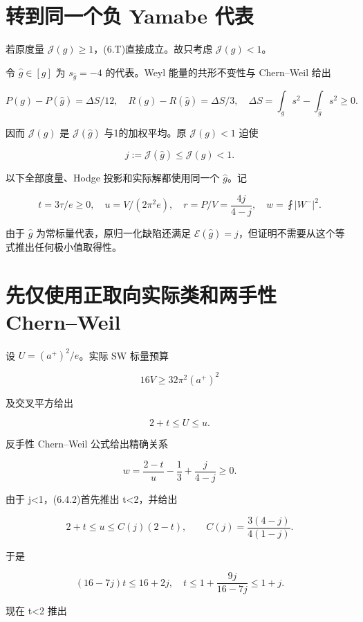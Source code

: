 \documentclass[UTF8,11pt,openany,fontset=none]{ctexbook}
\theoremstyle{definition}
\theoremstyle{remark}
\begin{document}
\section{转到同一个负 Yamabe 代表}\label{v6-ux8f6cux5230ux540cux4e00ux4e2aux8d1f-yamabe-ux4ee3ux8868}

若原度量 \(\mathcal J(g)\ge1\)，(6.T)直接成立。故只考虑 \(\mathcal J(g)<1\)。

令 \(\hat g\in[g]\) 为 \(s_{\hat g}=-4\) 的代表。Weyl 能量的共形不变性与 Chern--Weil 给出

\[
P(g)-P(\hat g)=\Delta S/12,\quad
R(g)-R(\hat g)=\Delta S/3,
\quad\Delta S=\int_gs^2-\int_{\hat g}s^2\ge0.
\]

因而 \(\mathcal J(g)\) 是 \(\mathcal J(\hat g)\) 与1的加权平均。原 \(\mathcal J(g)<1\) 迫使

\[
j:=\mathcal J(\hat g)\le\mathcal J(g)<1.
\tag{6.3.1}
\]

以下全部度量、Hodge 投影和实际解都使用同一个 \(\hat g\)。记

\[
t=3\tau/e\ge0,\quad u=V/(2\pi^2e),\quad
r=P/V=\frac{4j}{4-j},\quad
w=\fint|W^-|^2.
\tag{6.3.2}
\]

由于 \(\hat g\) 为常标量代表，原归一化缺陷还满足 \(\mathcal E(\hat g)=j\)，但证明不需要从这个等式推出任何极小值取得性。

\section{先仅使用正取向实际类和两手性 Chern--Weil}\label{v6-ux5148ux4ec5ux4f7fux7528ux6b63ux53d6ux5411ux5b9eux9645ux7c7bux548cux4e24ux624bux6027-chernweil}

设 \(U=(a^+)^2/e\)。实际 SW 标量预算

\[
16V\ge32\pi^2(a^+)^2
\]

及交叉平方给出

\[
2+t\le U\le u.
\tag{6.4.1}
\]

反手性 Chern--Weil 公式给出精确关系

\[
\boxed{w=\frac{2-t}{u}-\frac13+\frac{j}{4-j}\ge0.}
\tag{6.4.2}
\]

由于 j\textless1，(6.4.2)首先推出 t\textless2，并给出

\[
2+t\le u\le C(j)(2-t),\qquad
C(j)=\frac{3(4-j)}{4(1-j)}.
\tag{6.4.3}
\]

于是

\[
(16-7j)t\le16+2j,
\quad
\boxed{t\le1+\frac{9j}{16-7j}\le1+j.}
\tag{6.4.4}
\]

现在 t\textless2 推出
\end{document}
